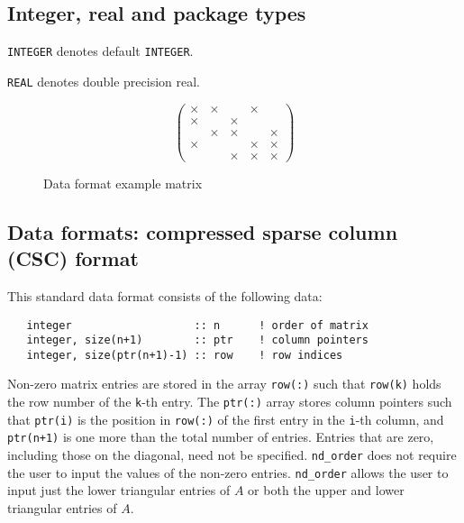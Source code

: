 

\subsection{Integer, real and package types}

{\tt INTEGER} denotes default {\tt INTEGER}.%

\noindent
{\tt REAL} denotes double precision real.


\begin{figure}
   \caption{ \label{nd:format_eg}
      Data format example matrix
   }
   $$
      \left( \begin{array}{ccccc}
         \times & \times &     & \times &     \\
         \times &     & \times &     &     \\
             & \times & \times &     & \times \\
         \times &     &     & \times & \times \\
             &     & \times & \times & \times
      \end{array} \right)
   $$
\end{figure}

\subsection{Data formats: compressed sparse column (CSC) format} \label{nd:cscformat}
This standard data format consists of the following data:
\begin{verbatim}
   integer                   :: n      ! order of matrix
   integer, size(n+1)        :: ptr    ! column pointers
   integer, size(ptr(n+1)-1) :: row    ! row indices
\end{verbatim}
Non-zero matrix entries are  stored in
the array \texttt{row(:)}  such that \texttt{row(k)} holds
the row number of the \texttt{k}-th entry.
The \texttt{ptr(:)} array stores column pointers such that \texttt{ptr(i)} is
the position in \texttt{row(:)}  of
the first entry in the \texttt{i}-th column, and \texttt{ptr(n+1)} is one more
than the total number of entries.
Entries that are zero, including those on the diagonal, need not be specified. 
\texttt{nd\_order} does not require the user to 
input the values of the non-zero entries.
\texttt{nd\_order} allows the user to input just the lower triangular 
entries of $A$  or both the upper and lower triangular entries of $A.$

